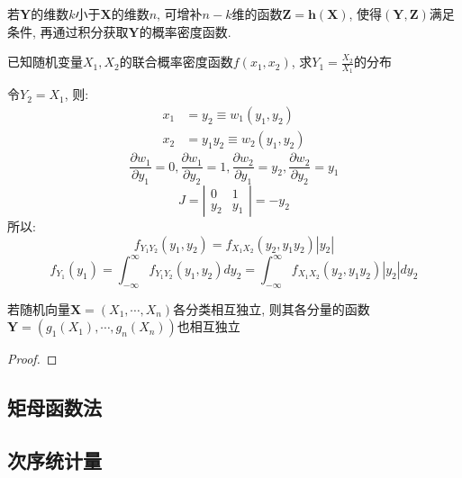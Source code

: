 \begin{remark}
    若$\mathbf{Y}$的维数$k$小于$\mathbf{X}$的维数$n$, 可增补$n-k$维的函数$\mathbf{Z}=\mathbf{h}(\mathbf{X})$, 使得$(\mathbf{Y},\mathbf{Z})$满足条件, 再通过积分获取$\mathbf{Y}$的概率密度函数.
\end{remark}

\begin{example}
    已知随机变量$X_1,X_2$的联合概率密度函数$f(x_1,x_2)$, 求$Y_1=\frac{X_2}{X_1}$的分布
\end{example}

\begin{solution}
    令$Y_{2}=X_{1}$, 则:
    \begin{align*}
        x_{1} & =y_{2}\equiv w_{1}(y_{1}, y_{2})       \\
        x_{2} & =y_{1} y_{2}\equiv w_{2}(y_{1}, y_{2})
    \end{align*}
    \[ \frac{\partial w_{1}}{\partial y_{1}}=0, \frac{\partial w_{1}}{\partial y_{2}}=1, \frac{\partial w_{2}}{\partial y_{1}}=y_{2}, \frac{\partial w_{2}}{\partial y_{2}}=y_{1}\]
    \[ J=\left|\begin{array}{cc}0 & 1 \\ y_{2} & y_{1}\end{array}\right|=-y_{2}\]
    所以:
    \[ f_{Y_1 Y_2}(y_1, y_2)=f_{X_1 X_2}(y_{2}, y_{1} y_{2})\left|y_2\right| \]
    \begin{equation}
        f_{Y_1}(y_1)=\int_{-\infty}^{\infty} f_{Y_{1} Y_{2}}\left(y_{1}, y_{2}\right) d y_{2}=\int_{-\infty}^{\infty} f_{X_{1} X_{2}}\left(y_{2}, y_{1} y_{2}\right)\left|y_{2}\right| d y_{2}
        \label{equ:quotient_of_variable}
    \end{equation}
    \[  \]
\end{solution}

\begin{proposition}
    若随机向量$\mathbf{X}=(X_1,\cdots ,X_n)$各分类相互独立, 则其各分量的函数$\mathbf{Y}=(g_1(X_1),\cdots ,g_n(X_n))$也相互独立
\end{proposition}
\begin{proof}

\end{proof}

\subsection{矩母函数法}

\subsection{次序统计量}

